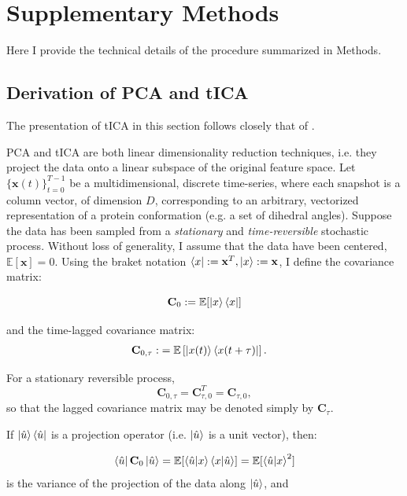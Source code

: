\section{Supplementary Methods}
\label{sec:SI_methods}
Here I provide the technical details of the procedure summarized in Methods.

\renewcommand{\thesubsection}{S\arabic{subsection}}
\setcounter{subsection}{0}

\subsection{Derivation of PCA and tICA}


\label{subsec:SI_dimred}
The presentation of tICA in this section follows closely that of \cite{my_tica_ref}.


PCA and tICA are both linear dimensionality reduction techniques, i.e. they project the data onto a linear subspace of the original feature space. 
Let $\{\mathbf{x}(t)\}_{t=0}^{T-1}$ be a multidimensional, discrete time-series, where each snapshot is a column vector, 
of dimension $D$, corresponding to an arbitrary, vectorized representation of a protein conformation (e.g. a set of dihedral angles). 
Suppose the data has been sampled from a \textit{stationary} and \textit{time-reversible} stochastic process. 
Without loss of generality, I assume that the data have been centered, $\mathbb E[\mathbf{x}] = 0 $. Using the braket notation $\bra{x} := \mathbf{x}^T, \ket{x} := \mathbf{x} $, I define the covariance matrix:


\begin{equation}
\mathbf{C}_0 := \mathbb{E}\!\left[\ket{x}\bra{x}\right]
\end{equation}

and the time-lagged covariance matrix:
\begin{align}
    \mathbf{C}_{0,\tau}:&= \mathbb{E}\left[\ket{x(t)}\bra{x(t + \tau)}\right].
\end{align}

For a stationary reversible process,
\begin{equation*}
\mathbf C_{0,\tau} = \mathbf C_{\tau,0}^{T} = \mathbf C_{\tau,0},
\end{equation*}
so that the lagged covariance matrix may be denoted simply by \(\mathbf C_\tau\).

If $\ket{\hat{u}}\bra{\hat{u}}$ is a projection operator (i.e. $\ket{\hat{u}}$ is a unit vector), then:

\begin{equation}
    \bra{\hat{u}}\mathbf{C}_0\ket{\hat{u}} = \mathbb{E}[\braket{\hat{u}|x}\braket{x|\hat{u}}] = \mathbb{E}[\braket{\hat{u}|x}^2]
\end{equation}
is the variance of the projection of the data along $\ket{\hat{u}}$, and

